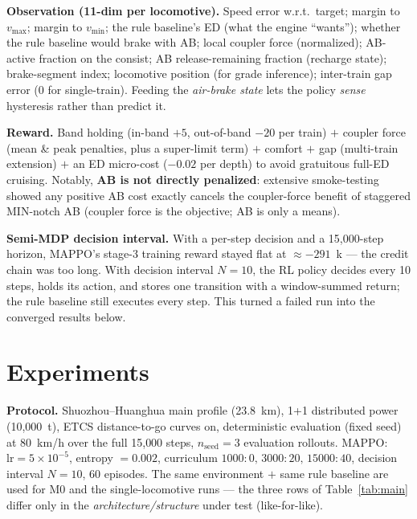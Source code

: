 \documentclass[conference]{IEEEtran}
\begin{document}
\textbf{Observation (11-dim per locomotive).} Speed error w.r.t.\ target;
margin to $v_{\max}$; margin to $v_{\min}$; the rule baseline's ED (what the
engine ``wants''); whether the rule baseline would brake with AB; local coupler
force (normalized); AB-active fraction on the consist; AB release-remaining
fraction (recharge state); brake-segment index; locomotive position (for grade
inference); inter-train gap error (0 for single-train). Feeding the
\emph{air-brake state} lets the policy \emph{sense} hysteresis rather than
predict it.

\textbf{Reward.} Band holding (in-band $+5$, out-of-band $-20$ per train) $+$
coupler force (mean \& peak penalties, plus a super-limit term) $+$ comfort $+$
gap (multi-train extension) $+$ an ED micro-cost ($-0.02$ per depth) to avoid
gratuitous full-ED cruising. Notably, \textbf{AB is not directly penalized}:
extensive smoke-testing showed any positive AB cost exactly cancels the
coupler-force benefit of staggered MIN-notch AB (coupler force is the
objective; AB is only a means).

\textbf{Semi-MDP decision interval.} With a per-step decision and a 15{,}000-step
horizon, MAPPO's stage-3 training reward stayed flat at $\approx -291$~k ---
the credit chain was too long. With decision interval $N{=}10$, the RL policy
decides every 10 steps, holds its action, and stores one transition with a
window-summed return; the rule baseline still executes every step. This turned
a failed run into the converged results below.

\section{Experiments}
\label{sec:experiments}

\textbf{Protocol.} Shuozhou--Huanghua main profile (23.8~km), 1+1 distributed
power (10{,}000~t), ETCS distance-to-go curves on, deterministic evaluation
(fixed seed) at 80~km/h over the full 15{,}000 steps, $n_{\text{seed}}=3$
evaluation rollouts. MAPPO: $\mathrm{lr}=5\times10^{-5}$, entropy
$=0.002$, curriculum $1000{:}0,\,3000{:}20,\,15000{:}40$, decision interval
$N{=}10$, 60 episodes. The same environment $+$ same rule baseline are used for
M0 and the single-locomotive runs --- the three rows of
Table~\ref{tab:main} differ only in the \emph{architecture/structure} under
test (like-for-like).
\end{document}
